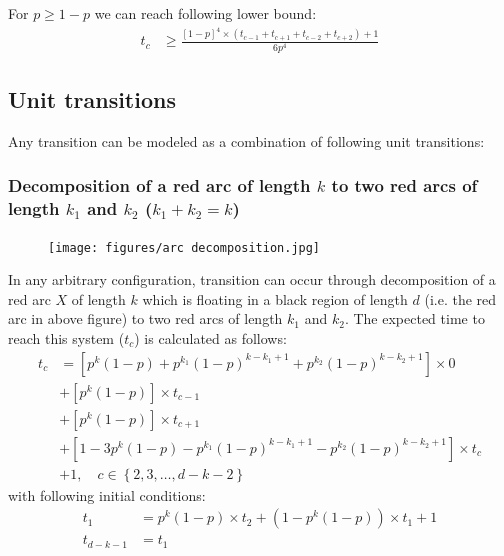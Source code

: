 \documentclass[]{book}
\theoremstyle{definition}
\begin{document}
For $p \ge 1-p$ we can reach following lower bound:
\begin{equation}
\begin{split}
    t_c & \ge \frac{\left[ 1-p \right]^4 \times \left( t_{c-1} + t_{c+1} + t_{c-2} + t_{c+2} \right) + 1}{6p^4}
\end{split}
\end{equation}

\subsection{Unit transitions}
Any transition can be modeled as a combination of following unit transitions:
\subsubsection{Decomposition of a red arc of length $k$ to two red arcs of length $k_1$ and $k_2$ ($k_1 + k_2 = k$)}
\begin{figure}[H]
    \centering\texttt{[image: figures/arc decomposition.jpg]}
    \caption{}
\end{figure}
In any arbitrary configuration, transition can occur through decomposition of a red arc $X$ of length $k$ which is floating in a black region of length $d$ (i.e. the red arc in above figure) to two red arcs of length $k_1$ and $k_2$. The expected time to reach this system ($t_c$) is calculated as follows:
\begin{equation}
\begin{split}
    t_c &= \left[ p^k\left( 1-p \right) + p^{k_1}\left(1-p\right)^{k-k_1+1} + p^{k_2}\left(1-p\right)^{k-k_2+1} \right] \times 0 \\
    &+ \left[ p^k\left( 1-p \right) \right] \times t_{c-1} \\
    &+ \left[ p^k\left( 1-p \right) \right] \times t_{c+1} \\
    &+ \left[1 - 3p^k\left( 1-p \right) - p^{k_1}\left(1-p\right)^{k-k_1+1} - p^{k_2}\left(1-p\right)^{k-k_2+1} \right] \times t_c \\
    &+ 1, \quad c \in \left\{2, 3, \hdots, d-k-2 \right\}
\end{split}
\end{equation}
with following initial conditions:
\begin{equation}
\begin{split}
    t_1 &= p^k\left( 1-p \right) \times t_2 + \left( 1-p^k\left( 1-p \right) \right) \times t_1 + 1 \\
    t_{d-k-1} &= t_1
\end{split}
\end{equation}
\end{document}

